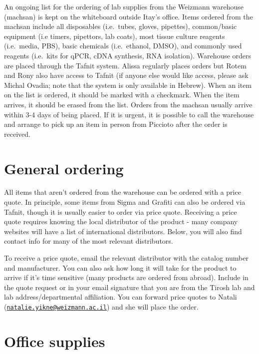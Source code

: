 \documentclass[]{book}
\begin{document}
An ongoing list for the ordering of lab supplies from the Weizmann
warehouse (machsan) is kept on the whiteboard outside Itay's office.
Items ordered from the machsan include all disposables (i.e.~tubes,
gloves, pipettes), common/basic equipment (i.e timers, pipettors, lab
coats), most tissue culture reagents (i.e.~media, PBS), basic chemicals
(i.e.~ethanol, DMSO), and commonly used reagents (i.e.~kits for qPCR,
cDNA synthesis, RNA isolation). Warehouse orders are placed through the
Tafnit system. Alissa regularly places orders but Rotem and Rony also
have access to Tafnit (if anyone else would like access, please ask
Michal Ovadia; note that the system is only available in Hebrew). When
an item on the list is ordered, it should be marked with a checkmark.
When the item arrives, it should be erased from the list. Orders from
the machsan usually arrive within 3-4 days of being placed. If it is
urgent, it is possible to call the warehouse and arrange to pick up an
item in person from Piccioto after the order is received.

\section{General ordering}\label{general-ordering}

All items that aren't ordered from the warehouse can be ordered with a
price quote. In principle, some items from Sigma and Grafiti can also be
ordered via Tafnit, though it is usually easier to order via price
quote. Receiving a price quote requires knowing the local distributor of
the product - many company websites will have a list of international
distributors. Below, you will also find contact info for many of the
most relevant distributors.

To receive a price quote, email the relevant distributor with the
catalog number and manufacturer. You can also ask how long it will take
for the product to arrive if it's time sensitive (many products are
ordered from abroad). Include in the quote request or in your email
signature that you are from the Tirosh lab and lab address/departmental
affiliation. You can forward price quotes to Natali
(\href{mailto:natalie.yikne@weizmann.ac.il}{\nolinkurl{natalie.yikne@weizmann.ac.il}})
and she will place the order.

\section{Office supplies}\label{office-supplies}
\end{document}
